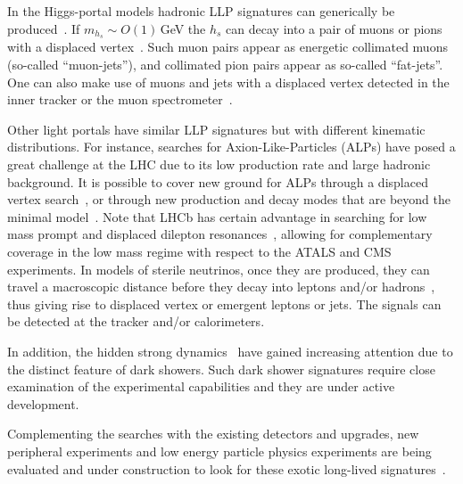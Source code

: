 \documentclass[10pt]{article}
\begin{document}
In the Higgs-portal models hadronic LLP signatures can generically be produced~\cite{Craig:2015pha,Csaki:2015fba,Liu:2018wte,Alipour-Fard:2018rbc,Liu:2020vur}. If $m_{h_s} \sim O(1)$\,GeV the $h_s$ can decay into
a pair of muons or pions with a displaced vertex~\cite{Chang:2016lfq}. Such muon pairs appear as energetic collimated muons (so-called ``muon-jets''), and collimated pion pairs appear as so-called ``fat-jets''. One can also make use of muons and jets with a displaced vertex detected in the inner tracker or the muon spectrometer~\cite{ATLAS:2018tup,CMS:2021juv}. 

Other light portals have similar LLP signatures but with different kinematic distributions. For instance, searches for Axion-Like-Particles (ALPs) have posed a great challenge at the LHC due to its low production rate and large hadronic background. It is possible to cover new ground for ALPs through a displaced vertex search~\cite{Hook:2019qoh}, or through new production and decay modes that are beyond the minimal model~\cite{Bauer:2017nlg}. Note that LHCb has certain advantage in searching for low mass prompt and displaced dilepton resonances~\cite{Ilten:2016tkc,Ilten:2018crw}, allowing for complementary coverage in the low mass regime with respect to the ATALS and CMS experiments. 
In models of sterile neutrinos, once they are produced, they can travel a macroscopic distance before they decay into leptons and/or hadrons~\cite{Liu:2019ayx,deVries:2020qns}, thus giving rise to
displaced vertex or emergent leptons or jets. The signals can be detected at the tracker and/or calorimeters.

In addition, the hidden strong dynamics~\cite{Strassler:2006im,Knapen:2016hky,Pierce:2017taw,Chacko:2020zze,Yuan:2020eeu,Knapen:2021eip} have gained increasing attention due to the distinct feature of dark showers. Such dark shower signatures require close examination of the experimental capabilities and they are under active development. 

Complementing the searches with the existing detectors and upgrades, new peripheral experiments and low energy particle physics experiments are being evaluated and under construction to look for these exotic long-lived signatures~\cite{Beacham:2019nyx}. 
\end{document}
